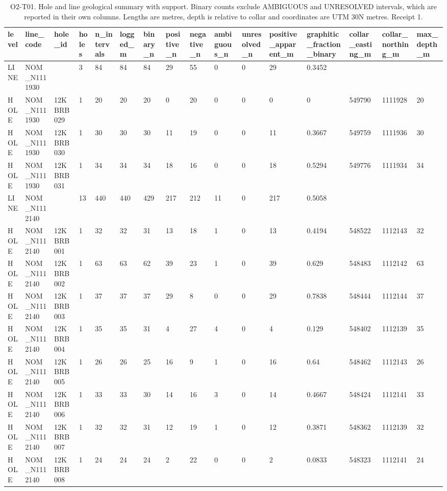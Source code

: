\begin{table}[ht]
\centering
\footnotesize
\caption{O2-T01. Hole and line geological summary with support. Binary counts exclude AMBIGUOUS and UNRESOLVED intervals, which are reported in their own columns. Lengths are metres, depth is relative to collar and coordinates are UTM 30N metres. Receipt 1.}
\label{tab:O2-T01}
\begin{tabular}{llllllllllllllll}
\toprule
level & line\_code & hole\_id & holes & n\_intervals & logged\_m & binary\_n & positive\_n & negative\_n & ambiguous\_n & unresolved\_n & positive\_apparent\_m & graphitic\_fraction\_binary & collar\_easting\_m & collar\_northing\_m & max\_depth\_m \\
\midrule
LINE & NOM\_N1111930 &  & 3 & 84 & 84 & 84 & 29 & 55 & 0 & 0 & 29 & 0.3452 &  &  &  \\
HOLE & NOM\_N1111930 & 12KBRB 029 & 1 & 20 & 20 & 20 & 0 & 20 & 0 & 0 & 0 & 0 & 549790 & 1111928 & 20 \\
HOLE & NOM\_N1111930 & 12KBRB 030 & 1 & 30 & 30 & 30 & 11 & 19 & 0 & 0 & 11 & 0.3667 & 549759 & 1111936 & 30 \\
HOLE & NOM\_N1111930 & 12KBRB 031 & 1 & 34 & 34 & 34 & 18 & 16 & 0 & 0 & 18 & 0.5294 & 549776 & 1111934 & 34 \\
LINE & NOM\_N1112140 &  & 13 & 440 & 440 & 429 & 217 & 212 & 11 & 0 & 217 & 0.5058 &  &  &  \\
HOLE & NOM\_N1112140 & 12KBRB 001 & 1 & 32 & 32 & 31 & 13 & 18 & 1 & 0 & 13 & 0.4194 & 548522 & 1112143 & 32 \\
HOLE & NOM\_N1112140 & 12KBRB 002 & 1 & 63 & 63 & 62 & 39 & 23 & 1 & 0 & 39 & 0.629 & 548483 & 1112142 & 63 \\
HOLE & NOM\_N1112140 & 12KBRB 003 & 1 & 37 & 37 & 37 & 29 & 8 & 0 & 0 & 29 & 0.7838 & 548444 & 1112144 & 37 \\
HOLE & NOM\_N1112140 & 12KBRB 004 & 1 & 35 & 35 & 31 & 4 & 27 & 4 & 0 & 4 & 0.129 & 548402 & 1112139 & 35 \\
HOLE & NOM\_N1112140 & 12KBRB 005 & 1 & 26 & 26 & 25 & 16 & 9 & 1 & 0 & 16 & 0.64 & 548462 & 1112143 & 26 \\
HOLE & NOM\_N1112140 & 12KBRB 006 & 1 & 33 & 33 & 30 & 14 & 16 & 3 & 0 & 14 & 0.4667 & 548424 & 1112141 & 33 \\
HOLE & NOM\_N1112140 & 12KBRB 007 & 1 & 32 & 32 & 31 & 12 & 19 & 1 & 0 & 12 & 0.3871 & 548362 & 1112139 & 32 \\
HOLE & NOM\_N1112140 & 12KBRB 008 & 1 & 24 & 24 & 24 & 2 & 22 & 0 & 0 & 2 & 0.0833 & 548323 & 1112141 & 24 \\

\end{tabular}
\end{table}
